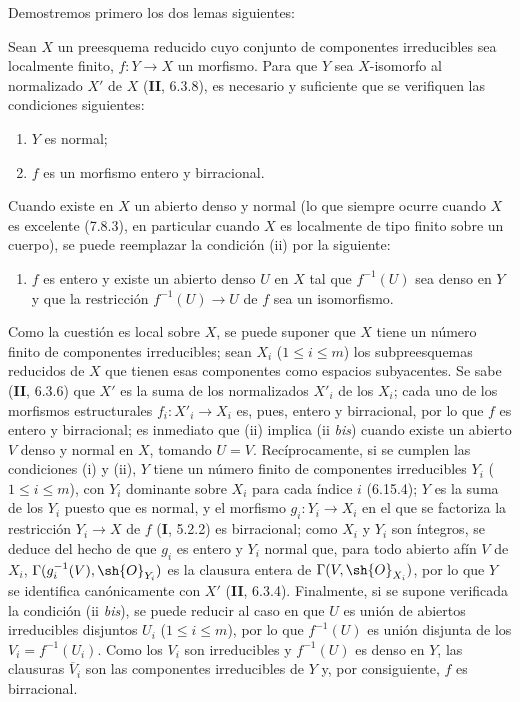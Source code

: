 Demostremos primero los dos lemas siguientes:

\begin{lemma}[17.15.14.1]
\label{IV.17.15.14.1}
Sean $X$ un preesquema reducido cuyo conjunto de componentes irreducibles sea localmente finito, $f:Y\to X$ un morfismo. Para que $Y$ sea $X$-isomorfo al normalizado $X'$ de $X$ \textup{(\textbf{II}, 6.3.8)}, es necesario y suficiente que se verifiquen las condiciones siguientes:
\begin{enumerate}
  \item[\textup{(i)}] $Y$ es normal;
  \item[\textup{(ii)}] $f$ es un morfismo entero y birracional.
\end{enumerate}
Cuando existe en $X$ un abierto denso y normal (lo que siempre ocurre cuando $X$ es excelente \textup{(7.8.3)}, en particular cuando $X$ es localmente de tipo finito sobre un cuerpo), se puede reemplazar la condición \textup{(ii)} por la siguiente:
\begin{enumerate}
  \item[\textup{(ii \emph{bis})}] $f$ es entero y existe un abierto denso $U$ en $X$ tal que $f^{-1}(U)$ sea denso en $Y$ y que la restricción $f^{-1}(U)\to U$ de $f$ sea un isomorfismo.
\end{enumerate}
\end{lemma}

Como la cuestión es local sobre $X$, se puede suponer que $X$ tiene un número finito de componentes irreducibles; sean $X_i$ ($1\leq i\leq m$) los subpreesquemas reducidos de $X$ que tienen esas componentes como espacios subyacentes. Se sabe (\textbf{II}, 6.3.6) que $X'$ es la suma de los normalizados $X'_i$ de los $X_i$; cada uno de los morfismos estructurales $f_i:X'_i\to X_i$ es, pues, entero y birracional, por lo que $f$ es entero y birracional; es inmediato que (ii) implica (ii \emph{bis}) cuando existe un abierto $V$ denso y normal en $X$, tomando $U=V$. Recíprocamente, si se cumplen las condiciones (i) y (ii), $Y$ tiene un número finito de componentes irreducibles $Y_i$ ($1\leq i\leq m$), con $Y_i$ dominante sobre $X_i$ para cada índice $i$ (6.15.4); $Y$ es la suma de los $Y_i$ puesto que es normal, y el morfismo $g_i:Y_i\to X_i$ en el que se factoriza la restricción $Y_i\to X$ de $f$ (\textbf I, 5.2.2) es birracional; como $X_i$ y $Y_i$ son íntegros, se deduce del hecho de que $g_i$ es entero y $Y_i$ normal que, para todo abierto afín $V$ de $X_i$, $\Gamma(g_i^{-1}(V),\sh{O}_{Y_i})$ es la clausura entera de $\Gamma(V,\sh{O}_{X_i})$, por lo que $Y$ se identifica canónicamente con $X'$ (\textbf{II}, 6.3.4). Finalmente, si se supone verificada la condición (ii \emph{bis}), se puede reducir al caso en que $U$ es unión de abiertos irreducibles disjuntos $U_i$ ($1\leq i\leq m$), por lo que $f^{-1}(U)$ es unión disjunta de los $V_i=f^{-1}(U_i)$. Como los $V_i$ son irreducibles y $f^{-1}(U)$ es denso en $Y$, las clausuras $\overline{V}_i$ son las componentes irreducibles de $Y$ y, por consiguiente, $f$ es birracional.


